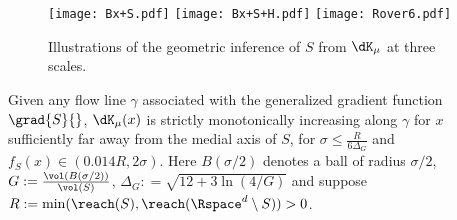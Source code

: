 \documentclass[11pt]{myclass}
\begin{document}
\begin{figure}
\texttt{[image: Bx+S.pdf]}
\hspace{.2in}
\texttt{[image: Bx+S+H.pdf]}
\hspace{.2in}
\texttt{[image: Rover6.pdf]}
\caption{\label{fig:inference}
Illustrations of the geometric inference of $S$ from $\dK_\mu$ at three scales.}
\end{figure}

\begin{lemma}
Given any flow line $\gamma$ associated with the generalized gradient function $\grad{S}{}$, $\dK_\mu(x)$ is strictly monotonically increasing along $\gamma$ for $x$ sufficiently far away from the medial axis of $S$, for $\sigma \leq \frac{R}{6\Delta_G}$ and $ f_S(x) \in (0.014 R, 2\sigma)$. 
Here $B(\sigma/2)$ denotes a ball of radius $\sigma/2$,  $G := \frac{\vol(B(\sigma/2))}{\vol(S)}$, $\Delta_G : = \sqrt{12 + 3\ln(4/G)}$ and suppose $R := \min(\reach(S), \reach(\Rspace^d \setminus S)) > 0$.  
\label{lem:monotonicity-app}
\end{lemma}
\end{document}
